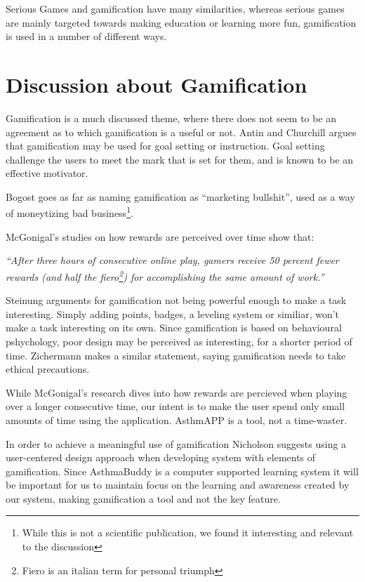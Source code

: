 Serious Games and gamification have many similarities, whereas serious games are mainly targeted towards making education or learning more fun, gamification is used in a number of different ways. 


\section{Discussion about Gamification}
\label{sec:gamificationdiscussion}

Gamification is a much discussed theme, where there does not seem to be an agreement as to which gamification is a useful or not. 
Antin and Churchill argues that gamification may be used for goal setting or instruction\cite{antin2011badges}. Goal setting challenge the users to meet the mark that is set for them, and is known to be an effective motivator\cite{ling2005using}. 

Bogost goes as far as naming gamification as ``marketing bullshit'', used as a way of moneytizing bad business\cite{gamificationbullshit}\footnote{While this is not a scientific publication, we found it interesting and relevant to the discussion}.

McGonigal's studies on how rewards are perceived over time show that: 

\textit{``After three hours of consecutive online play, gamers receive 50 percent fewer rewards (and half the fiero\footnote{Fiero is an italian term for personal triumph\cite{ekman2007emotions}}) for accomplishing the same amount of work.''}\cite{jane2011reality}

Steinung arguments for gamification not being powerful enough to make a task interesting\cite{steinung2012interessante}. Simply adding points, badges, a leveling system or similiar, won't make a task interesting on its own. Since gamification is based on behavioural pshychology, poor design may be perceived as interesting, for a shorter period of time\cite{steinung2012interessante}. Zichermann makes a similar statement, saying gamification needs to take ethical precautions\cite{zichermann2011gamification}.

While McGonigal's research dives into how rewards are percieved when playing over a longer consecutive time, our intent is to make the user spend only small amounts of time using the application. AsthmAPP is a tool, not a time-waster.

In order to achieve a meaningful use of gamification Nicholson\cite{nicholson2012user} suggests using a user-centered design approach\cite{usercentereddesign} when developing system with elements of gamification. Since AsthmaBuddy is a computer supported learning system\cite{stahl2006computer} it will be important for us to maintain focus on the learning and awareness created by our system, making gamification a tool and not the key feature.

